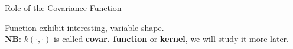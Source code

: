 \documentclass[11pt,compress,t,notes=noshow, xcolor=table]{beamer}
\begin{document}
\begin{vbframe}{Role of the Covariance Function}
\begin{itemize}
\end{itemize}

\begin{footnotesize}
Function exhibit interesting, variable shape. \\
\textbf{NB}: $k(\cdot,\cdot)$ is called \textbf{covar. function} or \textbf{kernel}, we will study it more later.
\end{footnotesize}

\end{vbframe}

\endlecture
\end{document}
